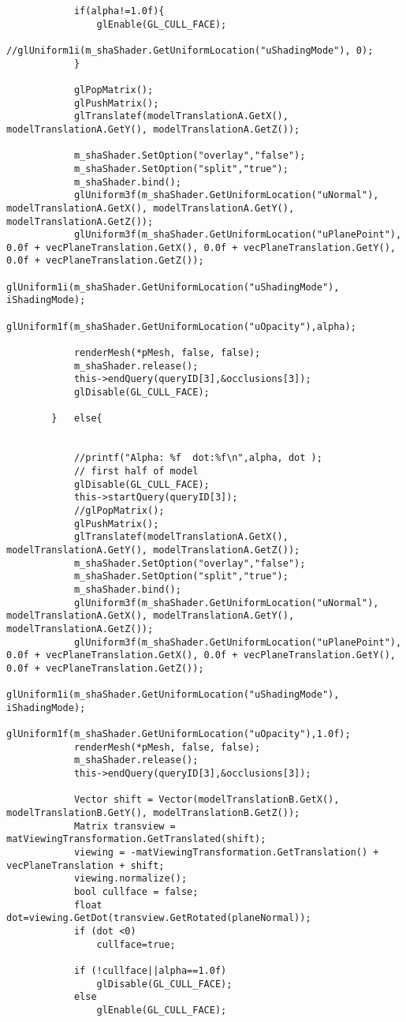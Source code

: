 \begin{verbatim}
			if(alpha!=1.0f){
				glEnable(GL_CULL_FACE);	
				//glUniform1i(m_shaShader.GetUniformLocation("uShadingMode"), 0);
			}

			glPopMatrix();
			glPushMatrix();
			glTranslatef(modelTranslationA.GetX(), modelTranslationA.GetY(), modelTranslationA.GetZ());

			m_shaShader.SetOption("overlay","false");
			m_shaShader.SetOption("split","true");
			m_shaShader.bind();
			glUniform3f(m_shaShader.GetUniformLocation("uNormal"), modelTranslationA.GetX(), modelTranslationA.GetY(), modelTranslationA.GetZ());
			glUniform3f(m_shaShader.GetUniformLocation("uPlanePoint"), 0.0f + vecPlaneTranslation.GetX(), 0.0f + vecPlaneTranslation.GetY(), 0.0f + vecPlaneTranslation.GetZ());
			glUniform1i(m_shaShader.GetUniformLocation("uShadingMode"), iShadingMode);
			glUniform1f(m_shaShader.GetUniformLocation("uOpacity"),alpha);
				
			renderMesh(*pMesh, false, false);
			m_shaShader.release();
			this->endQuery(queryID[3],&occlusions[3]);
			glDisable(GL_CULL_FACE);

		}	else{


			//printf("Alpha: %f  dot:%f\n",alpha, dot );
			// first half of model
			glDisable(GL_CULL_FACE);
			this->startQuery(queryID[3]);
			//glPopMatrix();
			glPushMatrix();
			glTranslatef(modelTranslationA.GetX(), modelTranslationA.GetY(), modelTranslationA.GetZ());
			m_shaShader.SetOption("overlay","false");
			m_shaShader.SetOption("split","true");
			m_shaShader.bind();
			glUniform3f(m_shaShader.GetUniformLocation("uNormal"), modelTranslationA.GetX(), modelTranslationA.GetY(), modelTranslationA.GetZ());
			glUniform3f(m_shaShader.GetUniformLocation("uPlanePoint"), 0.0f + vecPlaneTranslation.GetX(), 0.0f + vecPlaneTranslation.GetY(), 0.0f + vecPlaneTranslation.GetZ());
			glUniform1i(m_shaShader.GetUniformLocation("uShadingMode"), iShadingMode);
			glUniform1f(m_shaShader.GetUniformLocation("uOpacity"),1.0f);
			renderMesh(*pMesh, false, false);
			m_shaShader.release();
			this->endQuery(queryID[3],&occlusions[3]);

			Vector shift = Vector(modelTranslationB.GetX(), modelTranslationB.GetY(), modelTranslationB.GetZ());
			Matrix transview = matViewingTransformation.GetTranslated(shift);
			viewing = -matViewingTransformation.GetTranslation() + vecPlaneTranslation + shift;
			viewing.normalize();
			bool cullface = false;
			float dot=viewing.GetDot(transview.GetRotated(planeNormal));
			if (dot <0)
				cullface=true;

			if (!cullface||alpha==1.0f)
				glDisable(GL_CULL_FACE);
			else
				glEnable(GL_CULL_FACE);	


\end{verbatim}
